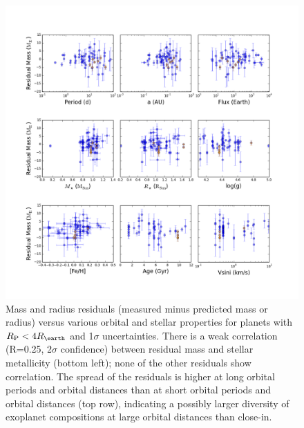 \documentclass[11pt]{aastex}
\newcommand{\rspecial}{4 \rearth}
\begin{document}
\begin{figure}[htbp] %
   \centering
    \includegraphics[width=6in]{mr_resids.png} 
   \caption{\small Mass and radius residuals (measured minus predicted mass or radius) versus various orbital and stellar properties for planets with $\rpl  < \rspecial$ and 1$\sigma$ uncertainties.  There is a weak correlation (R=0.25, 2$\sigma$ confidence) between residual mass and stellar metallicity (bottom left); none of the other residuals show correlation.  The spread of the residuals is higher at long orbital periods and orbital distances than at short orbital periods and orbital distances (top row), indicating a possibly larger diversity of exoplanet compositions at large orbital distances than close-in.}
   \label{fig:resids}
\end{figure}

\clearpage

{}

\end{document}
